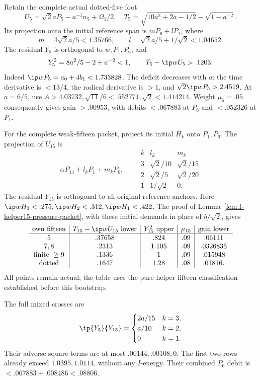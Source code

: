 Retain the complete actual dotted-five foot
\[
 U_5=\sqrt2aP_5-a^{-1}n_5+\Omega_1/2,\quad
 T_5=\sqrt{10a^2+2a-1/2}-\sqrt{1-a^{-2}}.
\]
Its projection onto the initial reference span is \(mP_6+lP_1\), where
\[
 m=4\sqrt2a/5<1.35766,\qquad
 l=\sqrt2a/5+1/\sqrt2<1.04652.
\]
The residual \(Y_5\) is orthogonal to \(w,P_1,P_6\), and
\[
 Y_5^2=8a^2/5-2+a^{-2}<1,\qquad T_5-\ip w{U_5}>.1203.
\]
Indeed \(\ip w{P_5}=a_0+4b_1<1.733828\). The deficit
decreases with \(a\): the time derivative is \(<13/4\),
the radical derivative is \(>1\), and
\(\sqrt2\ip w{P_5}>2.4519\).
At \(a=6/5\), use
\(A>4.03732,\sqrt{11}/6<.552771,\sqrt2<1.414214\).
Weight \(\mu_5=.05\) consequently gives gain \(>.00953\),
with debits \(<.067883\) at \(P_6\) and \(<.052326\) at \(P_1\).

For the complete weak-fifteen packet, project its initial \(H_k\)
onto \(P_1,P_6\). The projection of \(U_{15}\) is
\[
 \alpha P_{14}+l_kP_1+m_kP_6,\qquad
\begin{array}{c|cc}
k&l_k&m_k\\ \hline
3&\sqrt2/10&\sqrt2/15\\
2&\sqrt2/5&\sqrt2/20\\
1&1/\sqrt2&0 .
\end{array}
\]
The residual \(Y_{15}\) is orthogonal to all original reference
anchors. Here \(\ip w{H_3}<.275,\ip w{H_2}<.312,
\ip w{H_1}<.422\). The proof of
Lemma~\ref{lem:I-helper15-pressure-packet}, with these initial
demands in place of \(b/\sqrt2\), gives
\[
\begin{array}{c|c|c|c|c}
\text{own fifteen}&T_{15}-\ip w{U_{15}}\text{ lower}&
Y_{15}^2\text{ upper}&\mu_{15}&\text{gain lower}\\ \hline
5&.37658&.824&.09&.06111\\
7,8&.2313&1.105&.09&.0326835\\
\text{finite }\ge9&.1336&1&.09&.015948\\
\text{dotted}&.1647&1.28&.08&.01816 .
\end{array}
\]
All points remain actual; the table uses the pure-helper fifteen
classification established before this bootstrap.

The full mixed crosses are
\[
 \ip{Y_5}{Y_{15}}=
 \begin{cases}2a/15&k=3,\\a/10&k=2,\\0&k=1.\end{cases}
\]
Their adverse square terms are at most \(.00144,.00108,0\).
The first two rows already exceed \(1.0395,1.0114\), without
any \(I\)-energy. Their combined \(P_6\) debit is
\(<.067883+.008486<.08806\).

